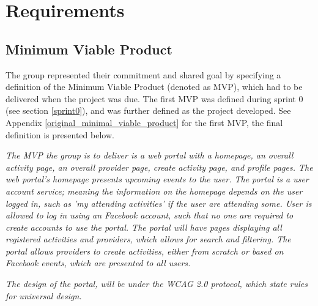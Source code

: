 
\chapter{Requirements}
\label{requirements}

\section{Minimum Viable Product}
\label{MVP}
The group represented their commitment and shared goal by specifying a definition of the Minimum Viable Product (denoted as MVP), which had to be delivered when the project was due. The first MVP was defined during sprint 0 (see section \ref{sprint0}), and was further defined as the project developed. See Appendix \ref{original_minimal_viable_product} for the first MVP, the final definition is presented below. 

\textit{ The MVP the group is to deliver is a web portal with a homepage, an overall activity page, an overall provider page, create activity page, and profile pages. The web portal's homepage presents upcoming events to the user. The portal is a user account service; meaning the information on the homepage depends on the user logged in, such as 'my attending activities' if the user are attending some. User is allowed to log in using an Facebook account, such that no one are required to create accounts to use the portal. The portal will have pages displaying all registered activities and providers, which allows for search and filtering. The portal allows providers to create activities, either from scratch or based on Facebook events, which are presented to all users. }

\textit{The design of the portal, will be under the WCAG 2.0 protocol, which state rules for universal design.}

